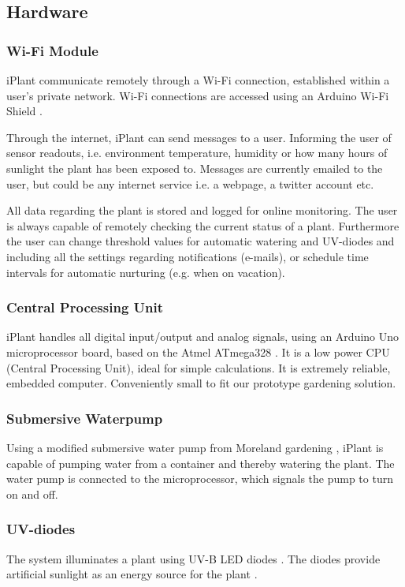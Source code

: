\documentclass{ubicomp2012}
\begin{document}
\subsection{Hardware}
\subsubsection{Wi-Fi Module}
iPlant communicate remotely through a Wi-Fi connection, established within a user’s private network. Wi-Fi connections are accessed using an Arduino Wi-Fi Shield \cite{arduino-wifi}.

Through the internet, iPlant can send messages to a user. Informing the user of sensor readouts, i.e. environment temperature, humidity or how many hours of sunlight the plant has been exposed to. Messages are currently emailed to the user, but could be any internet service i.e. a webpage, a twitter account etc.

All data regarding the plant is stored and logged for online monitoring. The user is always capable of remotely checking the current status of a plant. Furthermore the user can change threshold values for automatic watering and UV-diodes and including all the settings regarding notifications (e-mails), or schedule time intervals for automatic nurturing (e.g. when on vacation).

\subsubsection{Central Processing Unit}
iPlant handles all digital input/output and analog signals, using an Arduino Uno microprocessor board, based on the Atmel ATmega328 \cite{atmel328,arduino-uno}. It is a low power CPU (Central Processing Unit), ideal for simple calculations. It is extremely reliable, embedded computer. Conveniently small to fit our prototype gardening solution.

\subsubsection{Submersive Waterpump}
Using a modified submersive water pump from Moreland gardening \cite{moreland}, iPlant is capable of pumping water from a container and thereby watering the plant. The water pump is connected to the microprocessor, which signals the pump to turn on and off.

\subsubsection{UV-diodes}
The system illuminates a plant using UV-B LED diodes \cite{uv-diodes}. The diodes provide artificial sunlight as an energy source for the plant \cite{fotosyntese}.
\end{document}
